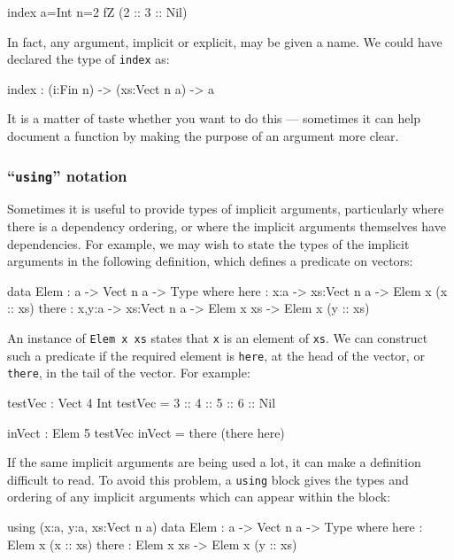 \begin{code}
index {a=Int} {n=2} fZ (2 :: 3 :: Nil)
\end{code}

\noindent
In fact, any argument, implicit or explicit, may be given a name.
We could have declared the type of \texttt{index} as:

\begin{code}
index : (i:Fin n) -> (xs:Vect n a) -> a
\end{code}

\noindent
It is a matter of taste whether you want to do this --- sometimes it can help document a function by making the purpose of an argument more clear.

\subsubsection{``\texttt{using}'' notation}

Sometimes it is useful to provide types of implicit arguments, particularly
where there is a dependency ordering, or where the implicit arguments themselves
have dependencies.
For example, we may wish to state the types of the implicit arguments
in the following definition, which defines a predicate on vectors:

\begin{code}
data Elem : a -> Vect n a -> Type where
   here :  {x:a} ->   {xs:Vect n a} -> Elem x (x :: xs)
   there : {x,y:a} -> {xs:Vect n a} -> Elem x xs -> Elem x (y :: xs)
\end{code}

\noindent
An instance of \texttt{Elem x xs} states that \texttt{x} is an element of
\texttt{xs}.
We can construct such a predicate if the required element is \texttt{here}, at the head of the vector, or \texttt{there}, in the tail of the vector.
For example:

\begin{code}
testVec : Vect 4 Int
testVec = 3 :: 4 :: 5 :: 6 :: Nil

inVect : Elem 5 testVec
inVect = there (there here)
\end{code}

\noindent
If the same implicit arguments are being used a lot, it can make a definition difficult to read.
To avoid this problem, a \texttt{using} block gives the types and ordering of any implicit arguments which can appear within the block:

\begin{code}
using (x:a, y:a, xs:Vect n a)
  data Elem : a -> Vect n a -> Type where
     here  : Elem x (x :: xs)
     there : Elem x xs -> Elem x (y :: xs)
\end{code}

